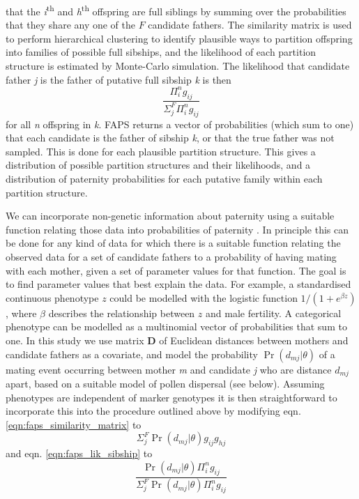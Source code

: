 \documentclass[10pt, a4paper, twocolumn]{article} %
\begin{document}
that the \textit{i}\textsuperscript{th} and \textit{h}\textsuperscript{th} offspring are full siblings by summing over the probabilities that they share any one of the $F$ candidate fathers. The similarity matrix is used to perform hierarchical clustering to identify plausible ways to partition offspring into families of possible full sibships, and the likelihood of each partition structure is estimated by Monte-Carlo simulation. The likelihood that candidate father \textit{j} is the father of putative full sibship \textit{k} is then
\begin{equation}\label{eqn:faps_lik_sibship}
\frac{
    \Pi_i^n g_{ij}
    }{
    \Sigma_j^F\Pi_i^n g_{ij}
    }
\end{equation}
for all \textit{n} offspring in \textit{k}. FAPS returns a vector of probabilities (which sum to one) that each candidate is the father of sibship \textit{k}, or that the true father was not sampled. This is done for each plausible partition structure. This gives a distribution of possible partition structures and their likelihoods, and a distribution of paternity probabilities for each putative family within each partition structure.

We can incorporate non-genetic information about paternity using a suitable function relating those data into probabilities of paternity \citep{hadfield2006towards}.
In principle this can be done for any kind of data for which there is a suitable function relating the observed data for a set of candidate fathers to a probability of having mating with each mother, given a set of parameter values for that function. The goal is to find parameter values that best explain the data. For example, a standardised continuous phenotype $z$ could be modelled with the logistic function $1/(1+e^{\beta z})$, where $\beta$ describes the relationship between $z$ and male fertility.
A categorical phenotype can be modelled as a multinomial vector of probabilities that sum to one.
In this study we use matrix \textbf{D} of Euclidean distances between mothers and candidate fathers as a covariate, and model the probability $\Pr(d_{mj}|\theta)$ of a mating event occurring between mother \textit{m} and candidate \textit{j} who are distance $d_{mj}$ apart, based on a suitable model of pollen dispersal (see below).
Assuming phenotypes are independent of marker genotypes it is then straightforward to incorporate this into the procedure outlined above by modifying eqn. \ref{eqn:faps_similarity_matrix} to
\begin{equation}\label{eqn:pairwise_with_covariates}
\Sigma_j^F \Pr(d_{mj} | \theta)g_{ij}g_{hj}
\end{equation}
and eqn. \ref{eqn:faps_lik_sibship} to
\begin{equation}
\label{sibship_with_covariates}
\frac{
    \Pr(d_{mj} | \theta)\Pi_i^n g_{ij}
    }{
    \Sigma_j^F \Pr(d_{mj} | \theta)\Pi_i^n g_{ij}
    }
\end{equation}
\end{document}
